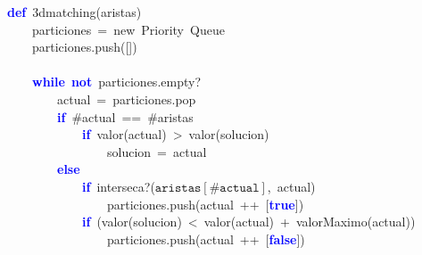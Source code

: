 \noindent
\mbox{}\textbf{\textcolor{Blue}{def}}\ 3dmatching\textcolor{BrickRed}{(}aristas\textcolor{BrickRed}{)} \\
\mbox{}\ \ \ \ particiones\ \textcolor{BrickRed}{=}\ new\ Priority\ Queue \\
\mbox{}\ \ \ \ particiones\textcolor{BrickRed}{.}push\textcolor{BrickRed}{([])} \\
\mbox{} \\
\mbox{}\ \ \ \ \textbf{\textcolor{Blue}{while}}\ \textbf{\textcolor{Blue}{not}}\ particiones\textcolor{BrickRed}{.}empty? \\
\mbox{}\ \ \ \ \ \ \ \ actual\ \textcolor{BrickRed}{=}\ particiones\textcolor{BrickRed}{.}pop \\
\mbox{}\ \ \ \ \ \ \ \ \textbf{\textcolor{Blue}{if}}\ \#actual\ \textcolor{BrickRed}{==}\ \#aristas \\
\mbox{}\ \ \ \ \ \ \ \ \ \ \ \ \textbf{\textcolor{Blue}{if}}\ valor\textcolor{BrickRed}{(}actual\textcolor{BrickRed}{)}\ \textcolor{BrickRed}{\textgreater{}}\ valor\textcolor{BrickRed}{(}solucion\textcolor{BrickRed}{)} \\
\mbox{}\ \ \ \ \ \ \ \ \ \ \ \ \ \ \ \ solucion\ \textcolor{BrickRed}{=}\ actual \\
\mbox{}\ \ \ \ \ \ \ \ \textbf{\textcolor{Blue}{else}} \\
\mbox{}\ \ \ \ \ \ \ \ \ \ \ \ \textbf{\textcolor{Blue}{if}}\ interseca?\textcolor{BrickRed}{(}$\mathtt{aristas[\#actual]}$\textcolor{BrickRed}{,}\ actual\textcolor{BrickRed}{)} \\
\mbox{}\ \ \ \ \ \ \ \ \ \ \ \ \ \ \ \ particiones\textcolor{BrickRed}{.}push\textcolor{BrickRed}{(}actual\ \textcolor{BrickRed}{++}\ \textcolor{BrickRed}{[}\textbf{\textcolor{Blue}{true}}\textcolor{BrickRed}{])} \\
\mbox{}\ \ \ \ \ \ \ \ \ \ \ \ \textbf{\textcolor{Blue}{if}}\ \textcolor{BrickRed}{(}valor\textcolor{BrickRed}{(}solucion\textcolor{BrickRed}{)}\ \textcolor{BrickRed}{\textless{}}\ valor\textcolor{BrickRed}{(}actual\textcolor{BrickRed}{)}\ \textcolor{BrickRed}{+}\ valorMaximo\textcolor{BrickRed}{(}actual\textcolor{BrickRed}{))} \\
\mbox{}\ \ \ \ \ \ \ \ \ \ \ \ \ \ \ \ particiones\textcolor{BrickRed}{.}push\textcolor{BrickRed}{(}actual\ \textcolor{BrickRed}{++}\ \textcolor{BrickRed}{[}\textbf{\textcolor{Blue}{false}}\textcolor{BrickRed}{])} \\
\mbox{} \\
